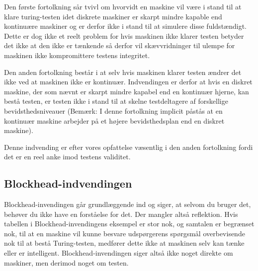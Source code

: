 \documentclass{article}
\begin{document}
Den første fortolkning sår tvivl om hvorvidt en maskine vil være i stand til at klare turing-testen idet diskrete maskiner er skarpt mindre kapable end kontinuære maskiner og er derfor ikke i stand til at simulere disse fuldstændigt. Dette er dog ikke et reelt problem for hvis maskinen ikke klarer testen betyder det ikke at den ikke er tænkende så derfor vil skævvridninger til ulempe for maskinen ikke kompromittere testens integritet.

Den anden fortolkning består i at selv hvis maskinen klarer testen ændrer det ikke ved at maskinen ikke er kontinuær. Indvendingen er derfor at hvis en diskret maskine, der som nævnt er skarpt mindre kapabel end en kontinuær hjerne, kan bestå testen, er testen ikke i stand til at skelne testdeltagere af forskellige bevidsthedsniveauer (Bemærk: I denne fortolkning implicit påstås at en kontinuær maskine arbejder på et højere bevidsthedsplan end en diskret maskine).

Denne indvending er efter vores opfattelse væsentlig i den anden fortolkning fordi det er en reel anke imod testens validitet.


\subsection{Blockhead-indvendingen}

Blockhead-invendingen går grundlæggende ind og siger, at selvom du bruger det, behøver du ikke have en forståelse for det. Der mangler altså reflektion.
Hvis tabellen i Blockhead-invendingens eksempel er stor nok, og samtalen er begrænset nok, til at en maskine vil kunne besvare udspørgerens spørgsmål overbevisende nok til at bestå Turing-testen, medfører dette ikke at maskinen selv kan tænke eller er intelligent. Blockhead-invendingen siger altså ikke noget direkte om maskiner, men derimod noget om testen.
\end{document}
